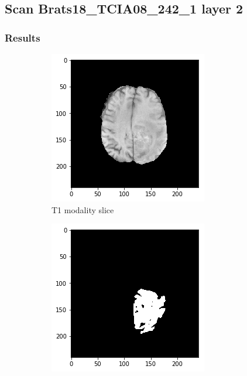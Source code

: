 \subsection{Scan Brats18\_TCIA08\_242\_1 layer 2}
\subsubsection{Results}


\begin{figure}[H]
    \centering
    \begin{subfigure}[t]{.24\textwidth}
        \centering
        \includegraphics[width=\linewidth]{chapters/06_hdm/b_Brats18_TCIA08_242_1_L2/21.png}
        \caption{T1 modality slice}
    \end{subfigure}%
    \begin{subfigure}[t]{.24\textwidth}
        \centering
        \includegraphics[width=\linewidth]{chapters/06_hdm/b_Brats18_TCIA08_242_1_L2/20.png}

\end{subfigure}
\end{figure}

